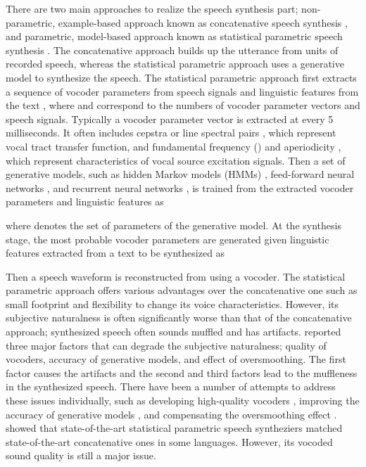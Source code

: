 \documentclass{article}
\begin{document}
There are two main approaches to realize the speech synthesis part; non-parametric, example-based approach known as concatenative speech synthesis \citep{PSOLA,ATR_nutalk,Hunt_UnitSelection_ICASSP}, and parametric, model-based approach known as statistical parametric speech synthesis \citep{yoshimura_PhD,Zen_SPSS_SPECOM}.
The concatenative approach builds up the utterance from units of recorded speech, whereas the statistical parametric approach uses a generative model to synthesize the speech.
The statistical parametric approach first extracts a sequence of vocoder parameters \citep{Vocoder}  from speech signals  and linguistic features  from the text , where  and  correspond to the numbers of vocoder parameter vectors and speech signals.
Typically a vocoder parameter vector  is extracted at every 5 milliseconds.
It often includes cepstra \citep{UELS} or line spectral pairs \citep{LSP}, which represent 
vocal tract transfer function, and fundamental
frequency () and aperiodicity \citep{Kawahara_STRAIGHT_Excitation}, which represent characteristics of vocal source excitation signals.
Then a set of generative models, such as hidden Markov models (HMMs) \citep{yoshimura_PhD}, feed-forward neural networks \citep{Zen_DNN_ICASSP}, and recurrent neural networks \citep{Robinson_RNNTTS,Karaani_RTDNNTTS,Fan_BLSTM_Interspeech14}, is trained from the extracted vocoder parameters and linguistic features as

where  denotes the set of parameters of the generative model.
At the synthesis stage, the most probable vocoder parameters are generated given linguistic features extracted from a text to be synthesized as

Then a speech waveform is reconstructed from  using a vocoder.
The statistical parametric approach offers various advantages over the
concatenative one such as small footprint
and flexibility to change its voice characteristics.
However, its subjective naturalness is often significantly worse than that of the concatenative approach; synthesized speech often sounds muffled and has artifacts.
\cite{Zen_SPSS_SPECOM} reported three major factors that can degrade the subjective naturalness; quality of vocoders, accuracy of generative models, and effect of oversmoothing.
The first factor causes the artifacts and the second and third factors lead to the muffleness in the synthesized speech.
There have been a number of attempts to address these issues individually, such as developing high-quality vocoders \citep{Kawahara_STRAIGHT,Vocaine,WORLD}, improving the accuracy of generative models \citep{Zen_trjHMM_CSL,Zen_DNN_ICASSP,Fan_BLSTM_Interspeech14,Uria_TrajectoryRNADE_ICASSP2015}, and compensating the oversmoothing effect \citep{Toda_MLGV_IEICE,Takamichi_ModulationSpectrum_TASLP}.
\cite{Zen_LSTMprod_Interspeech} showed that state-of-the-art statistical parametric speech syntheziers matched state-of-the-art concatenative ones in some languages.
However, its vocoded sound quality is still a major issue.
\end{document}
